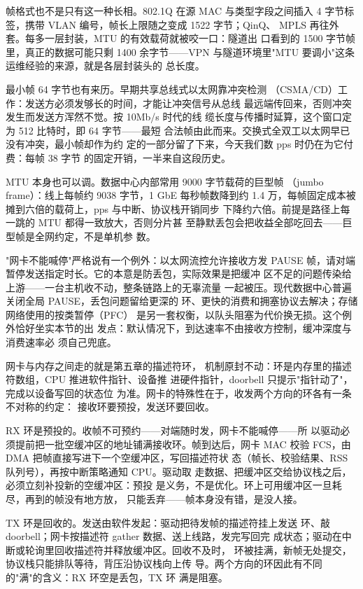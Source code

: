 帧格式也不是只有这一种长相。802.1Q 在源 MAC 与类型字段之间插入
4 字节标签，携带 VLAN 编号，帧长上限随之变成 1522 字节；QinQ、
MPLS 再往外套。每多一层封装，MTU 的有效载荷就被咬一口：隧道出
口看到的 1500 字节帧里，真正的数据可能只剩 1400 余字节——VPN
与隧道环境里"MTU 要调小"这条运维经验的来源，就是各层封装头的
总长度。

最小帧 64 字节也有来历。早期共享总线式以太网靠冲突检测
（CSMA/CD）工作：发送方必须发够长的时间，才能让冲突信号从总线
最远端传回来，否则冲突发生而发送方浑然不觉。按 10Mb/s 时代的线
缆长度与传播时延算，这个窗口定为 512 比特时，即 64 字节——最短
合法帧由此而来。交换式全双工以太网早已没有冲突，最小帧却作为约
定的一部分留了下来，今天我们数 pps 时仍在为它付费：每帧 38 字节
的固定开销，一半来自这段历史。

MTU 本身也可以调。数据中心内部常用 9000 字节载荷的巨型帧
（jumbo frame）：线上每帧约 9038 字节，1 GbE 每秒帧数降到约 1.4
万，每帧固定成本被摊到六倍的载荷上，pps 与中断、协议栈开销同步
下降约六倍。前提是路径上每一跳的 MTU 都得一致放大，否则分片甚
至静默丢包会把收益全部吃回去——巨型帧是全网约定，不是单机参
数。

"网卡不能喊停"严格说有一个例外：以太网流控允许接收方发 PAUSE
帧，请对端暂停发送指定时长。它的本意是防丢包，实际效果是把缓冲
区不足的问题传染给上游——一台主机收不动，整条链路上的无辜流量
一起被压。现代数据中心普遍关闭全局 PAUSE，丢包问题留给更深的
环、更快的消费和拥塞协议去解决；存储网络使用的按类暂停（PFC）
是另一套权衡，以队头阻塞为代价换无损。这个例外恰好坐实本节的出
发点：默认情况下，到达速率不由接收方控制，缓冲深度与消费速率必
须自己兜底。

网卡与内存之间走的就是第五章的描述符环，
机制原封不动：环是内存里的描述符数组，CPU 推进软件指针、设备推
进硬件指针，doorbell 只提示"指针动了"，完成以设备写回的状态位
为准。网卡的特殊性在于，收发两个方向的环各有一条不对称的约定：
接收环要预投，发送环要回收。

RX 环是预投的。收帧不可预约——对端随时发，网卡不能喊停——所
以驱动必须提前把一批空缓冲区的地址铺满接收环。帧到达后，网卡
MAC 校验 FCS，由 DMA 把帧直接写进下一个空缓冲区，写回描述符状
态（帧长、校验结果、RSS 队列号），再按中断策略通知 CPU。驱动取
走数据、把缓冲区交给协议栈之后，必须立刻补投新的空缓冲区：预投
是义务，不是优化。环上可用缓冲区一旦耗尽，再到的帧没有地方放，
只能丢弃——帧本身没有错，是没人接。

TX 环是回收的。发送由软件发起：驱动把待发帧的描述符挂上发送
环、敲 doorbell；网卡按描述符 gather 数据、送上线路，发完写回完
成状态；驱动在中断或轮询里回收描述符并释放缓冲区。回收不及时，
环被挂满，新帧无处提交，协议栈只能排队等待，背压沿协议栈向上传
导。两个方向的环因此有不同的"满"的含义：RX 环空是丢包，TX 环
满是阻塞。

